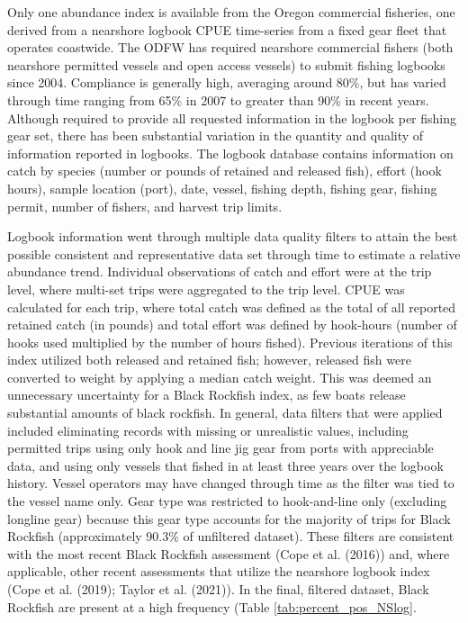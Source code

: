 \documentclass[11pt,
  letterpaper,
]{article}
\begin{document}
Only one abundance index is available from the Oregon commercial fisheries, one derived from a nearshore logbook CPUE time-series from a fixed gear fleet that operates coastwide. The ODFW has required nearshore commercial fishers (both nearshore permitted vessels and open access vessels) to submit fishing logbooks since 2004. Compliance is generally high, averaging around 80\%, but has varied through time ranging from 65\% in 2007 to greater than 90\% in recent years. Although required to provide all requested information in the logbook per fishing gear set, there has been substantial variation in the quantity and quality of information reported in logbooks. The logbook database contains information on catch by species (number or pounds of retained and released fish), effort (hook hours), sample location (port), date, vessel, fishing depth, fishing gear, fishing permit, number of fishers, and harvest trip limits.

Logbook information went through multiple data quality filters to attain the best possible consistent and representative data set through time to estimate a relative abundance trend. Individual observations of catch and effort were at the trip level, where multi-set trips were aggregated to the trip level. CPUE was calculated for each trip, where total catch was defined as the total of all reported retained catch (in pounds) and total effort was defined by hook-hours (number of hooks used multiplied by the number of hours fished). Previous iterations of this index utilized both released and retained fish; however, released fish were converted to weight by applying a median catch weight. This was deemed an unnecessary uncertainty for a Black Rockfish index, as few boats release substantial amounts of black rockfish. In general, data filters that were applied included eliminating records with missing or unrealistic values, including permitted trips using only hook and line jig gear from ports with appreciable data, and using only vessels that fished in at least three years over the logbook history. Vessel operators may have changed through time as the filter was tied to the vessel name only. Gear type was restricted to hook-and-line only (excluding longline gear) because this gear type accounts for the majority of trips for Black Rockfish (approximately 90.3\% of unfiltered dataset). These filters are consistent with the most recent Black Rockfish assessment (Cope et al. (2016)) and, where applicable, other recent assessments that utilize the nearshore logbook index (Cope et al. (2019); Taylor et al. (2021)). In the final, filtered dataset, Black Rockfish are present at a high frequency (Table \ref{tab:percent_pos_NSlog}.
\end{document}
